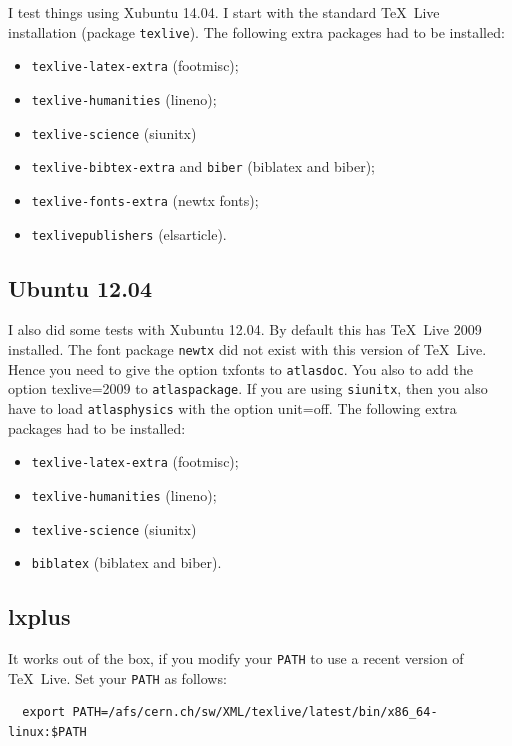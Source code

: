 \documentclass[UKenglish]{latex/atlasdoc}
\newcommand{\Option}[1]{\textsf{#1}\xspace}
\newcommand{\Package}[1]{\texttt{#1}\xspace}
\begin{document}
I test things using Xubuntu 14.04.
I start with the standard \TeX\ Live installation (package \texttt{texlive}).
The following extra packages had to be installed:
\begin{itemize}\setlength{\parskip}{0pt}\setlength{\itemsep}{0pt}
\item \Package{texlive-latex-extra} (footmisc);
\item \Package{texlive-humanities} (lineno);
\item \Package{texlive-science} (siunitx)
\item \Package{texlive-bibtex-extra} and \Package{biber} (biblatex and biber);
\item \Package{texlive-fonts-extra} (newtx fonts);
\item \Package{texlivepublishers} (elsarticle).
\end{itemize}


\subsection{Ubuntu 12.04}

I also did some tests with Xubuntu 12.04.
By default this has \TeX\ Live 2009 installed.
The font package \Package{newtx} did not exist with this version of \TeX\ Live.
Hence you need to give the option \Option{txfonts} to \Package{atlasdoc}.
You also to add the option \Option{texlive=2009} to \Package{atlaspackage}.
If you are using \Package{siunitx}, then you also have to load \Package{atlasphysics}
with the option \Option{unit=off}.
The following extra packages had to be installed:
\begin{itemize}\setlength{\parskip}{0pt}\setlength{\itemsep}{0pt}
\item \Package{texlive-latex-extra} (footmisc);
\item \Package{texlive-humanities} (lineno);
\item \Package{texlive-science} (siunitx)
\item \Package{biblatex} (biblatex and biber).
\end{itemize}


\subsection{lxplus} 

It works out of the box, if you modify your \texttt{PATH} to use a recent version of \TeX\ Live.
Set your \texttt{PATH} as follows:
\begin{verbatim}
  export PATH=/afs/cern.ch/sw/XML/texlive/latest/bin/x86_64-linux:$PATH
\end{verbatim}
\end{document}
